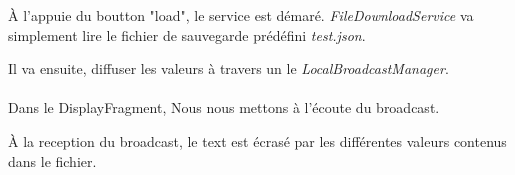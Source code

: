 \documentclass[a4paper]{article}
\begin{document}
\begin{multicols}{2}
                À l'appuie du boutton "load", le service est démaré. \emph{FileDownloadService} va simplement lire le fichier de sauvegarde prédéfini \emph{test.json}.

                Il va ensuite, diffuser les valeurs à travers un le \emph{LocalBroadcastManager}.
            \paragraph{}
                Dans le DisplayFragment, Nous nous mettons à l'écoute du broadcast. 

                
                
                À la reception du broadcast, le text est écrasé par les différentes valeurs contenus dans le fichier.


    \end{multicols}
\end{document}

